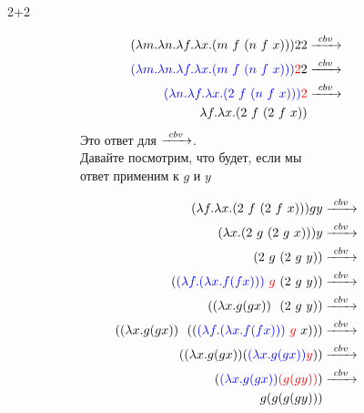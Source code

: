 \begin{frame}{2+2}
  \begin{figure}[t]
    \begin{subfigure}[t]{0.50\textwidth}
      \begin{align*}
        (\lambda m. \lambda n. \lambda f. \lambda x. \app{m\ f\ }{\app{n\ f\ }{x}}){} 2 2 &\cbv \\
        \textcolor{blue}{(\lambda m. \lambda n. \lambda f. \lambda x. \app{m\ f\ }{\app{n\ f\ }{x}}) {}} \textcolor{red}{2} 2 &\cbv \\
        \textcolor{blue}{( \lambda n. \lambda f. \lambda x. \app{2\ f\ }{\app{n\ f\ }{x}}){}} \textcolor{red}{2} & \cbv \\
        \lambda f. \lambda x. \app{2\ f\ }{\app{2\ f\ }{x}}   &
      \end{align*}
      Это ответ для $\xrightarrow{\ cbv\ }$.\\

      Давайте посмотрим, что будет, если мы \\
      ответ применим к $g$ и $y$
    \end{subfigure}
    \begin{subfigure}[t]{0.45\textwidth}
      \begin{align*}
        (\lambda f. \lambda x. (2\ f\  (2\ f\  x))) g y  &\xrightarrow{\ cbv\ } \\
        (\lambda x. (2\ g\  (2\ g\  x))) y  &\xrightarrow{\ cbv\ } \\
        (2\ g\  (2\ g\  y))   &\xrightarrow{\ cbv\ } \\
        (\textcolor{blue}{(\lambda f . (\lambda x . f (f x)))} \ \textcolor{red}{g}\  (2\ g\  y)) &\xrightarrow{\ cbv\ } \\
        ((\lambda x . g (g x)) \ \  (2\ g\  y)) &\xrightarrow{\ cbv\ } \\
        ((\lambda x . g (g x)) \ \  ((\textcolor{blue}{(\lambda f . (\lambda x . f (f x)))}\ \textcolor{red}{g}\  x) )) &\xrightarrow{\ cbv\ } \\
        ((\lambda x . g (g x))   (\textcolor{blue}{(\lambda x . g (g x)) }  \textcolor{red}{y})) &\xrightarrow{\ cbv\ } \\
        (\textcolor{blue}{(\lambda x . g (g x)) }  \textcolor{red}{(g (g y))}) &\xrightarrow{\ cbv\ } \\
        g (g (g (g y))) &
      \end{align*}
    \end{subfigure}
  \end{figure}
\end{frame}

